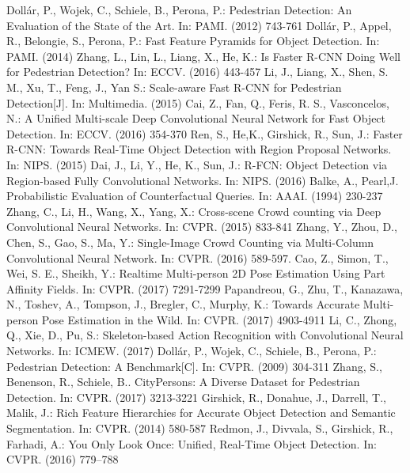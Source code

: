 \documentclass[runningheads]{llncs}
\begin{document}
\begin{thebibliography}{50}
	Dollár, P., Wojek, C., Schiele, B., Perona, P.: Pedestrian Detection: An Evaluation of the State of the Art. In: PAMI. (2012) 743-761
	Dollár, P., Appel, R., Belongie, S., Perona, P.: Fast Feature Pyramids for Object Detection. In: PAMI. (2014)
	Zhang, L., Lin, L., Liang, X., He, K.: Is Faster R-CNN Doing Well for Pedestrian Detection? In: ECCV. (2016) 443-457
	Li, J., Liang, X., Shen, S. M., Xu, T., Feng, J., Yan S.: Scale-aware Fast R-CNN for Pedestrian Detection[J]. In: Multimedia. (2015)
	Cai, Z., Fan, Q., Feris, R. S., Vasconcelos, N.: A Unified Multi-scale Deep Convolutional Neural Network for Fast Object Detection. In: ECCV. (2016) 354-370
	Ren, S., He,K., Girshick, R., Sun, J.: Faster R-CNN: Towards Real-Time Object Detection with Region Proposal Networks. In: NIPS. (2015)
	Dai, J., Li, Y., He, K., Sun, J.: R-FCN: Object Detection via Region-based Fully Convolutional Networks. In: NIPS. (2016)
	Balke, A., Pearl,J. Probabilistic Evaluation of Counterfactual Queries. In: AAAI. (1994) 230-237	
	Zhang, C., Li, H., Wang, X., Yang, X.: Cross-scene Crowd counting via Deep Convolutional Neural Networks. In: CVPR. (2015) 833-841 
	Zhang, Y., Zhou, D., Chen, S., Gao, S., Ma, Y.: Single-Image Crowd Counting via Multi-Column Convolutional Neural Network. In: CVPR. (2016) 589-597. 	
	Cao, Z., Simon, T., Wei, S. E., Sheikh, Y.: Realtime Multi-person 2D Pose Estimation Using Part Affinity Fields. In: CVPR. (2017) 7291-7299	
	Papandreou, G., Zhu, T., Kanazawa, N., Toshev, A., Tompson, J., Bregler, C., Murphy, K.:  Towards Accurate Multi-person Pose Estimation in the Wild. In: CVPR. (2017) 4903-4911	
	Li, C., Zhong, Q., Xie, D., Pu, S.: Skeleton-based Action Recognition with Convolutional Neural Networks. In: ICMEW. (2017)		
	Dollár, P., Wojek, C., Schiele, B., Perona, P.: Pedestrian Detection: A Benchmark[C]. In: CVPR. (2009) 304-311		
	Zhang, S., Benenson, R., Schiele, B.. CityPersons: A Diverse Dataset for Pedestrian Detection. In: CVPR. (2017) 3213-3221
	Girshick, R., Donahue, J., Darrell, T., Malik, J.: Rich Feature Hierarchies for Accurate Object Detection and Semantic Segmentation. In: CVPR. (2014) 580-587 
	Redmon, J., Divvala, S., Girshick, R., Farhadi, A.: You Only Look Once: Unified, Real-Time Object Detection. In: CVPR. (2016) 779–788 

\end{thebibliography}
\end{document}
